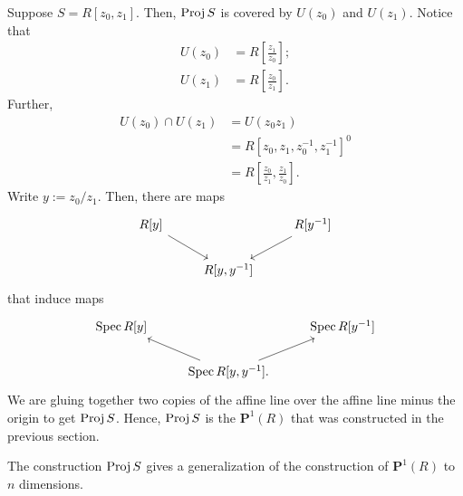\documentclass [11 pt, oneside] {article}
\begin{document}
\begin{example}[ ]\label{}\text{}
Suppose $S=R[z_0,z_1]$. Then, $\operatorname{Proj} S$ is covered by $U(z_0)$ and $U(z_1)$. Notice that
\begin{align*}
	U(z_0) &= R\left[ \frac{z_1}{z_0} \right] ;\\
	U(z_1)&= R \left[ \frac{z_0}{z_1} \right] .
\end{align*}
Further,
\begin{align*}
	U(z_0) \cap U(z_1) &= U(z_0z_1)\\
			     &= R [z_0,z_1,z_0^{-1},z_1^{-1}]^0\\
			     &= R \left[ \frac{z_0}{z_1},\frac{z_1}{z_0} \right] .
\end{align*}
Write $y:=z_0/z_1$. Then, there are maps
\[
\begin{tikzcd}
	R[y] \ar[dr] && R[y^{-1}] \ar[dl]\\
		     &R[y,y^{-1}]
\end{tikzcd}
\]
that induce maps
\[
\begin{tikzcd}
	\Spec R[y] &&\Spec R[y^{-1}]\\
		   &\Spec R[y,y^{-1}]\ar[ur]\ar[ul].
\end{tikzcd}
\]
We are gluing together two copies of the affine line over the affine line minus the origin to get $\operatorname{Proj} S$. Hence, $\operatorname{Proj} S $ is the $\mathbf{P}^1(R)$ that was constructed in the previous section.

\end{example}

\begin{remark}
	The construction $\operatorname{Proj} S$ gives a generalization of the construction of $\mathbf{P}^1(R)$ to $n$ dimensions.
\end{remark}
\end{document}
